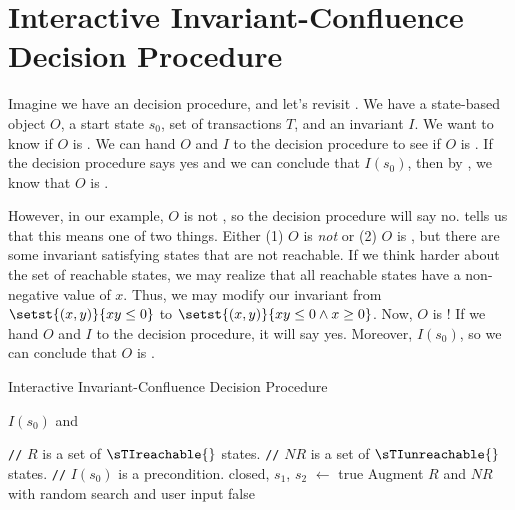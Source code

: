 \section{Interactive Invariant-Confluence Decision Procedure}
\newcommand{\IsInvConfluent}{\textsc{IsInvConfluent}}
\newcommand{\IsIclosed}{\textsc{IsIclosed}}
\newcommand{\Helper}{\textsc{Helper}}

Imagine we have an \Iclosed{} decision procedure, and let's revisit
. We have a state-based object $O$, a start
state $s_0$, set of transactions $T$, and an invariant $I$. We want to know if
$O$ is \sTIconfluent{}. We can hand $O$ and $I$ to the \Iclosed{} decision
procedure to see if $O$ is \Iclosed{}. If the decision procedure says yes and
we can conclude that $I(s_0)$, then by , we know
that $O$ is \sTIconfluent{}.

However, in our example, $O$ is not \Iclosed{}, so the decision procedure will
say no.  tells us that this means one of two
things. Either (1) $O$ is \emph{not} \sTIconfluent{} or (2) $O$ is
\sTIconfluent{}, but there are some invariant satisfying states that are not
reachable. If we think harder about the set of reachable states, we may realize
that all reachable states have a non-negative value of $x$. Thus, we may modify
our invariant from $\setst{(x, y)}{xy \leq 0}$ to $\setst{(x, y)}{xy \leq 0
\land x \geq 0}$. Now, $O$ is \Iclosed{}! If we hand $O$ and $I$ to the
decision procedure, it will say yes. Moreover, $I(s_0)$, so we can conclude
that $O$ is \sTIconfluent{}.

\newcommand{\comment}[1]{\State \textcolor{flatdenim}{\texttt{//} #1}}
\begin{algorithm}
  \caption{Interactive Invariant-Confluence Decision Procedure}%
  \begin{algorithmic}
      \State
        \Return $I(s_0)$ and
    \EndFunction

    \State

    \comment{$R$ is a set of $\sTIreachable{}$ states.}
    \comment{$NR$ is a set of $\sTIunreachable{}$ states.}
    \comment{$I(s_0)$ is a precondition.}
      \State closed, $s_1$, $s_2$ $\gets$ 
        \State \Return true
      \Else
        \State Augment $R$ and $NR$ with random search and user input
          \State \Return false
        \Else
          \State \Return {}
        \EndIf
      \EndIf
    \EndFunction
  \end{algorithmic}
\end{algorithm}

